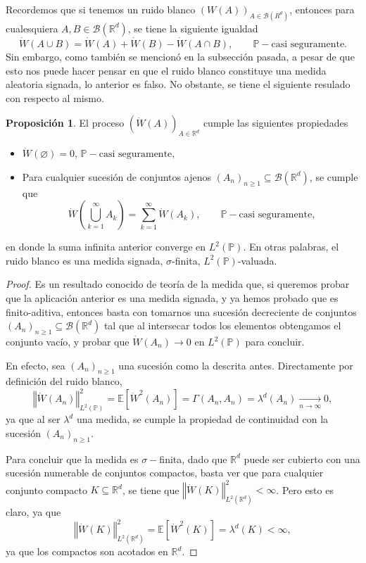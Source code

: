 \documentclass[letterpaper,twoside]{book}
\newcommand{\R}{\mathbb{R}}
\newcommand{\B}{\mathcal{B}}
\newcommand{\E}{\mathbb{E}}
\renewcommand{\P}{\mathbb{P}}
\newcommand{\W}{\dot{W}}
\newcommand{\1}{\mathds{1}}
\renewcommand{\to}{\rightarrow}
\newcommand{\norm}[1]{\left\Vert #1 \right\Vert}
\theoremstyle{definition}
\theoremstyle{definition}
\theoremstyle{definition}
\theoremstyle{definition}
\newtheorem{prop}{Proposición}
\theoremstyle{definition}
\theoremstyle{definition}
\theoremstyle{definition}
\begin{document}
Recordemos que si tenemos un ruido blanco $(W(A))_{A\in \B(R^{d})}$, entonces para cualesquiera $A,B \in \B(\R^{d})$, se tiene la siguiente igualdad
\[
\W(A\cup B)=\W(A)+\W(B)-\W(A\cap B), \qquad \P-\text{casi seguramente.}   
\]
Sin embargo, como también se mencionó en la subsección pasada, a pesar de que esto nos puede hacer pensar en que el ruido blanco constituye una medida aleatoria signada, lo anterior es falso. No obstante, se tiene el siguiente resulado con respecto al mismo.
\begin{prop}\label{Finito_aditiv_ruido_blanco}
 El proceso $(\W(A))_{A\in \R^{d}}$ cumple las siguientes propiedades
 \begin{itemize}
    \item $\W(\varnothing)=0$, \qquad $\P-\text{casi seguramente,}$
    \item Para cualquier sucesión de conjuntos ajenos $(A_n)_{n\geq 1}\subseteq \B(\R^d)$, se cumple que 
    \[
    \W \left(\bigcup_{k=1}^\infty A_k\right)=\sum_{k=1}^{\infty}\W(A_k), \qquad \P-\text{casi seguramente,} 
    \]
 \end{itemize}
 en donde la suma infinita anterior converge en $L^2(\P)$. En otras palabras, el 
 ruido blanco es una medida signada, $\sigma$-finita, $L^2(\P)$-valuada.
\end{prop}
 \begin{proof} 
    Es un resultado conocido de teoría de la medida que, si queremos probar que la aplicación anterior es una medida signada, y ya hemos probado que es finito-aditiva, entonces basta con tomarnos una sucesión decreciente de conjuntos $(A_n)_{n\geq1}\subseteq\B(\R^{d})$ tal que al intersecar todos los elementos obtengamos el conjunto vacío, y probar que $\W(A_n)\to 0$ en $L^{2}(\P)$ para concluir.

    En efecto, sea $(A_n)_{n\geq1}$ una sucesión como la descrita antes. Directamente por definición del ruido blanco, 
    \[
    \norm{\W(A_n)}_{L^2(\P)}^2=\E\left[\W^2(A_n)\right]=\Gamma(A_n,A_n)=\lambda^{d}(A_n)\xrightarrow[n\to\infty]{}0,    
    \]
    ya que al ser $\lambda^d$ una medida, se cumple la propiedad de continuidad con la sucesión $(A_n)_{n\geq1}$.

    Para concluir que la medida es $\sigma-$finita, dado que $\R^{d}$ puede ser cubierto con una sucesión numerable de conjuntos compactos, basta ver que para cualquier conjunto compacto $K\subseteq\R^{d}$, se tiene que $\norm{\W(K)}_{L^ {2}(\R^{d})}^2<\infty$. Pero esto es claro, ya que 
    \[
        \norm{\W(K)}_{L^ {2}(\R^{d})}^2=\E\left[\W^2(K)\right]=\lambda^{d}(K)<\infty,
    \]
    ya que los compactos son acotados en $\R^{d}$.
  \end{proof}  
\end{document}
